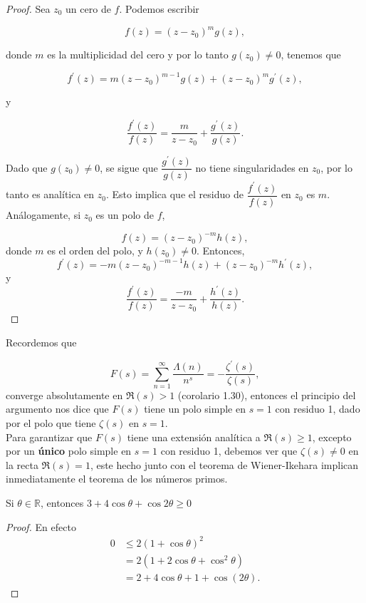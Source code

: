 \begin{proof}
    Sea $z_0$ un cero de $f$. Podemos escribir 

$$
f(z) = \left(z - z_0\right)^m g(z),
$$

donde $m$ es la multiplicidad del cero y por lo tanto $g\left(z_0\right) \neq 0$, tenemos que

$$
f^{\prime}(z) = m\left(z - z_0\right)^{m-1} g(z) + \left(z - z_0\right)^m g^{\prime}(z),
$$

y

$$
\frac{f^{\prime}(z)}{f(z)} = \frac{m}{z - z_0} + \frac{g^{\prime}(z)}{g(z)}.
$$

Dado que $g\left(z_0\right) \neq 0$, se sigue que $\dfrac{g^{\prime}(z)}{g(z)}$ no tiene singularidades en $z_0$, por lo tanto es analítica en $z_0$. Esto implica que el residuo de $\dfrac{f^{\prime}(z)}{f(z)}$ en $z_0$ es $m$.\\

Análogamente, si $z_{0}$ es un polo de $f$, 

$$
f(z)=(z-z_{0})^{-m}h(z),
$$
donde $m$ es el orden del polo, y $h\left(z_0\right) \neq 0$. Entonces, 
$$
f^{\prime}(z) = -m\left(z - z_0\right)^{-m-1} h(z) + \left(z - z_0\right)^{-m} h^{\prime}(z),
$$
y
$$
\frac{f^{\prime}(z)}{f(z)} = \frac{-m}{z - z_0} + \frac{h^{\prime}(z)}{h(z)}.
$$
\end{proof}

Recordemos que

$$F(s)=\sum_{n=1}^{\infty} \frac{\Lambda(n)}{n^s}=-\frac{\zeta^{\prime}(s)}{\zeta(s)}
,$$
converge absolutamente en $\Re(s)>1$ (corolario 1.30), entonces el principio del argumento nos dice que $F(s)$ tiene un polo simple en $s=1$ con residuo 1, dado por el polo que tiene $\zeta(s)$ en $s=1$.\\

Para garantizar que $F(s)$ tiene una extensión analítica a $\Re(s)\geq 1$, excepto por un \textbf{único} polo simple en $s=1$ con residuo 1, debemos ver que $\zeta(s)\neq 0$ en la recta $\Re(s)=1$, este hecho junto con el teorema de Wiener-Ikehara implican inmediatamente el teorema de los números primos.

\begin{lemma}
    Si $\theta\in \mathbb{R}$, entonces $3+4\cos\theta+\cos2\theta\geq 0$
\end{lemma}

\begin{proof}
    En efecto
    \begin{align*}
        0&\leq 2(1+\cos\theta)^2\\
        &=2(1+2\cos\theta+\cos^2\theta)\\
        &=2+4\cos\theta+1+\cos(2\theta)
    .\end{align*}
    \end{proof}

